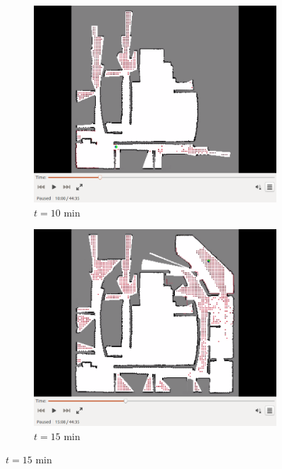 \documentclass[smallextended]{svjour3}       %
\begin{document}
\begin{figure}[!ht]
\begin{subfigure}[t]{0.3\columnwidth}
    \end{subfigure}
    \begin{subfigure}[t]{0.3\columnwidth}
           \centering
           \includegraphics[trim = {4.6cm 3.8cm 4.6cm 0}, clip, width=\textwidth]{10min.png}
        \caption{$t=10$ min}
        \label{fig:IRL10min}
    \end{subfigure}
    \begin{subfigure}[t]{0.3\columnwidth}
           \centering
           \includegraphics[trim = {4.6cm 3.8cm 4.6cm 0}, clip, width=\textwidth]{15min.png}
        \caption{$t=15$ min}

\end{subfigure}
\end{figure}
\end{document}
